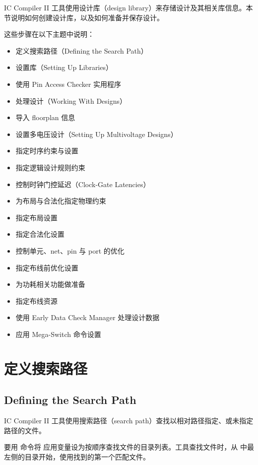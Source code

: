 \label{chap:prep}

IC Compiler II 工具使用设计库（design library）来存储设计及其相关库信息。本节说明如何创建设计库，以及如何准备并保存设计。

这些步骤在以下主题中说明：
\begin{itemize}
  \item 定义搜索路径（Defining the Search Path）
  \item 设置库（Setting Up Libraries）
  \item 使用 Pin Access Checker 实用程序
  \item 处理设计（Working With Designs）
  \item 导入 floorplan 信息
  \item 设置多电压设计（Setting Up Multivoltage Designs）
  \item 指定时序约束与设置
  \item 指定逻辑设计规则约束
  \item 控制时钟门控延迟（Clock-Gate Latencies）
  \item 为布局与合法化指定物理约束
  \item 指定布局设置
  \item 指定合法化设置
  \item 控制单元、net、pin 与 port 的优化
  \item 指定布线前优化设置
  \item 为功耗相关功能做准备
  \item 指定布线资源
  \item 使用 Early Data Check Manager 处理设计数据
  \item 应用 Mega-Switch 命令设置
\end{itemize}

\section{定义搜索路径}
\subsection*{Defining the Search Path}

IC Compiler II 工具使用搜索路径（search path）查找以相对路径指定、或未指定路径的文件。

要用  命令将  应用变量设为按顺序查找文件的目录列表。工具查找文件时，从  中最左侧的目录开始，使用找到的第一个匹配文件。

